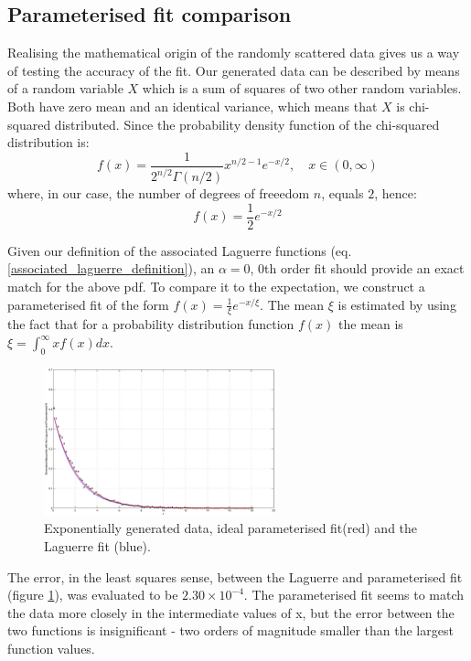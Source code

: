 \documentclass[a4paper]{article}
\numberwithin{equation}{section}
\begin{document}
\subsection{Parameterised fit comparison}
Realising the mathematical origin of the randomly scattered data gives us a way of testing the accuracy of the fit. Our generated data can be described by means of a random variable $X$ which is a sum of squares of two other random variables. Both have zero mean and an identical variance, which means that $X$ is chi-squared distributed. Since the probability density function of the chi-squared distribution is:
\begin{equation}
f(x) = \frac{1}{2^{n/2} \Gamma(n/2)}x^{n/2-1} e^{-x/2}, \quad x \in (0, \infty)
\end{equation}
where, in our case, the number of degrees of freeedom $n$, equals $2$, hence:
\begin{equation}
f(x) = \frac{1}{2} e^{-x/2}
\end{equation}

\noindent Given our definition of the associated Laguerre functions (eq. \ref{associated_laguerre_definition}), an $\alpha = 0$, 0th order fit should provide an exact match for the above pdf. To compare it to the expectation, we construct a parameterised fit of the form $f(x) = \frac{1}{\xi} e^{-x/\xi}$. The mean $\xi$ is estimated by using the fact that for a probability distribution function $f(x)$ the mean is $\xi = \int_{0}^{\infty} xf(x) dx$.

\begin{figure}[!h]
\centering
\includegraphics[width=0.6\textwidth]{laguerre_parameterised_fit.eps}
\caption{\label{fig:laguerreparemeterisedfit}Exponentially generated data, ideal parameterised fit(red) and the Laguerre fit (blue).}
\end{figure}

\noindent The error, in the least squares sense, between the Laguerre and parameterised fit (figure \ref{fig:laguerreparemeterisedfit}), was evaluated to be $2.30 \times 10^{-4}$. The parameterised fit seems to match the data more closely in the intermediate values of x, but the error between the two functions is insignificant - two orders of magnitude smaller than the largest function values.
\end{document}
